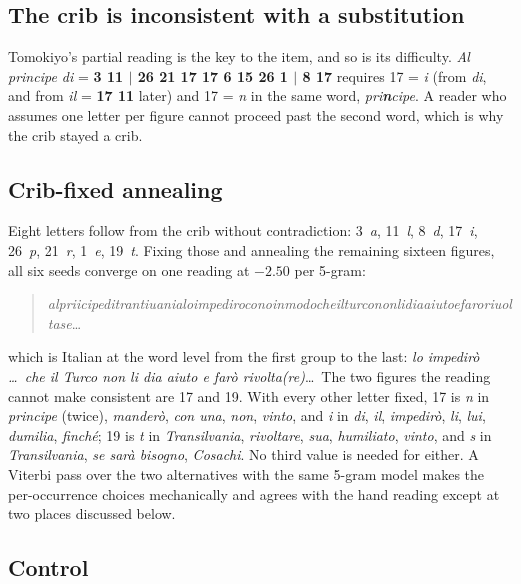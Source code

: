 \documentclass[11pt]{article}
\begin{document}
\subsection{The crib is inconsistent with a substitution}

Tomokiyo's partial reading is the key to the item, and so is its difficulty. \emph{Al principe di} = \textbf{3 11 $|$ 26 21 17 17 6 15 26 1 $|$ 8 17} requires 17 = \emph{i} (from \emph{di}, and from \emph{il} = \textbf{17 11} later) and 17 = \emph{n} in the same word, \emph{pri\textbf{n}cipe}. A reader who assumes one letter per figure cannot proceed past the second word, which is why the crib stayed a crib.

\subsection{Crib-fixed annealing}

Eight letters follow from the crib without contradiction: 3~\emph{a}, 11~\emph{l}, 8~\emph{d}, 17~\emph{i}, 26~\emph{p}, 21~\emph{r}, 1~\emph{e}, 19~\emph{t}. Fixing those and annealing the remaining sixteen figures, all six seeds converge on one reading at $-2.50$ per 5-gram:

\begin{quote}\small
\emph{alpriicipeditrantiuanialoimpediroconoinmodocheilturcononlidiaaiutoefaroriuoltase}\ldots
\end{quote}

which is Italian at the word level from the first group to the last: \emph{lo impedir\`o \ldots\ che il Turco non li dia aiuto e far\`o rivolta(re)}\ldots\ The two figures the reading cannot make consistent are 17 and 19. With every other letter fixed, 17 is \emph{n} in \emph{principe} (twice), \emph{mander\`o}, \emph{con una}, \emph{non}, \emph{vinto}, and \emph{i} in \emph{di}, \emph{il}, \emph{impedir\`o}, \emph{li}, \emph{lui}, \emph{dumilia}, \emph{finch\'e}; 19 is \emph{t} in \emph{Transilvania}, \emph{rivoltare}, \emph{sua}, \emph{humiliato}, \emph{vinto}, and \emph{s} in \emph{Transilvania}, \emph{se sar\`a bisogno}, \emph{Cosachi}. No third value is needed for either. A Viterbi pass over the two alternatives with the same 5-gram model makes the per-occurrence choices mechanically and agrees with the hand reading except at two places discussed below.

\subsection{Control}
\end{document}
